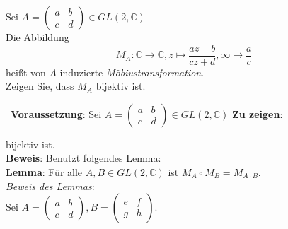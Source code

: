 \begin{assignment}
  Sei \( A = \begin{pmatrix}
    a & b \\
    c & d 
  \end{pmatrix} \in GL(2,\mathbb{C}) \) \\
  Die Abbildung
    \begin{equation*}
    M_A : \bar{\mathbb{C}} \to \bar{\mathbb{C}}, z \mapsto \frac{az + b}{cz + d}, \infty \mapsto \frac{a}{c}
  \end{equation*}
  heißt von $ A $ induzierte \emph{Möbiustransformation}.\\
  Zeigen Sie, dass $M_A$ bijektiv ist.
\end{assignment}
\begin{solution}
 \
   \textbf{Voraussetzung}: Sei \( A = \begin{pmatrix}
    a & b \\
    c & d 
  \end{pmatrix} \in GL(2,\mathbb{C}) \) 
  \textbf{Zu zeigen}:

  bijektiv ist. \\
  \textbf{Beweis}: Benutzt folgendes Lemma: \\
  \textbf{Lemma}: Für alle \( A,B \in GL(2, \mathbb{C}) \) ist \( M_A \circ M_B = M_{A \cdot B} \). \\
  \emph{Beweis des Lemmas}: \\
  Sei \( A = \left(\begin{smallmatrix}
    a & b \\
    c & d
  \end{smallmatrix} \right), B = \left(\begin{smallmatrix}
    e & f \\
    g & h
  \end{smallmatrix} \right) \). \\
  
  

\end{solution}
